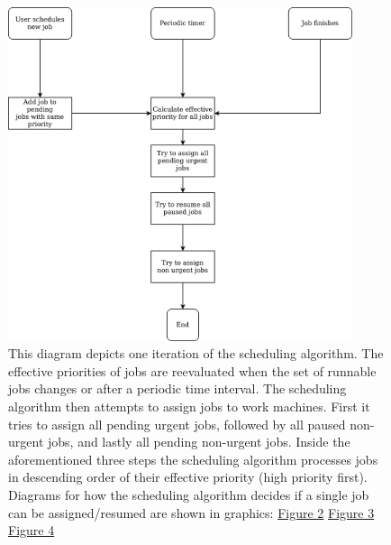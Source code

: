 \begin{figure}
  \centering
  \includegraphics[width=0.9\textwidth]{./customer/diagrams/png/main-idea.png}
  \caption{This diagram depicts one iteration of the scheduling algorithm.
    The effective priorities of jobs are reevaluated when the set of runnable jobs changes or after a periodic time interval.
    The scheduling algorithm then attempts to assign jobs to work machines.
    First it tries to assign all pending urgent jobs, followed by all paused non-urgent jobs, and lastly all pending non-urgent jobs.
    Inside the aforementioned three steps the scheduling algorithm processes jobs in descending order of their effective priority (high priority first).
    Diagrams for how the scheduling algorithm decides if a single job can be assigned/resumed are shown in graphics: \hyperref[urgent]{Figure 2} \hyperref[paused]{Figure 3} \hyperref[non-urgent]{Figure 4}}
\end{figure}
